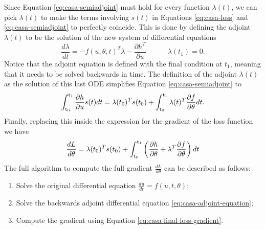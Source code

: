 Since Equation \eqref{eq:casa-semiadjoint} must hold for every function $\lambda(t)$, we can pick $\lambda(t)$ to make the terms involving $s(t)$ in Equations \eqref{eq:casa-loss} and \eqref{eq:casa-semiadjoint} to perfectly coincide. 
This is done by defining the adjoint $\lambda(t)$ to be the solution of the new system of differential equations
\begin{equation}
    \frac{d\lambda}{dt} 
    = 
    - 
    f(u, \theta, t)^T \lambda  
    - 
    \frac{\partial h^T}{\partial u} 
    \qquad \quad \lambda(t_1) = 0. 
    \label{eq:casa-adjoint-equation}
\end{equation}
Notice that the adjoint equation is defined with the final condition at $t_1$, meaning that it needs to be solved backwards in time. 
The definition of the adjoint $\lambda(t)$ as the solution of this last ODE simplifies Equation \eqref{eq:casa-semiadjoint} to
\begin{equation}
    \operatorname{\int_{t_0}^{t_1}} \frac{\partial h}{\partial u} s(t) dt
    = 
    \lambda(t_0)^T s(t_0)
    + 
    \operatorname{\int_{t_0}^{t_1}} \lambda(t)^T \frac{\partial f}{\partial \theta} dt.
\end{equation}
Finally, replacing this inside the expression for the gradient of the loss function we have 
\begin{equation}
    \frac{dL}{d\theta}
    = 
    \lambda(t_0)^T s(t_0)
    + 
    \operatorname{\int_{t_0}^{t_1}}
    \left( \frac{\partial h}{\partial \theta} + \lambda^T \frac{\partial f}{\partial \theta} \right) dt
    \label{eq:casa-final-loss-gradient}
\end{equation}
The full algorithm to compute the full gradient $\frac{dL}{d\theta}$ can be described as follows:
\begin{enumerate}
    \item Solve the original differential equation $\frac{du}{dt} = f(u, t, \theta)$;
    \item Solve the backwards adjoint differential equation \eqref{eq:casa-adjoint-equation};
    \item Compute the gradient using Equation \eqref{eq:casa-final-loss-gradient}.
\end{enumerate}




